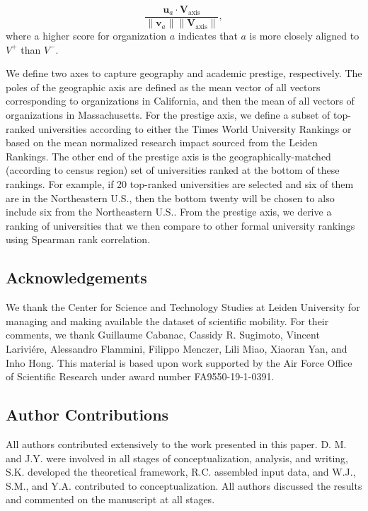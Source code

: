 \documentclass[12pt]{article} %
\begin{document}
\begin{equation}
\frac{\bm{u}_{a} \cdot \bm{V}_{\text{axis}}}{\lVert \bm{v}_{a} \rVert \lVert \bm{V}_{\text{axis}} \rVert},
\end{equation}
where a higher score for organization $a$ indicates that $a$ is more closely aligned to $V^+$ than $V^-$.

We define two axes to capture geography and academic prestige, respectively.
The poles of the geographic axis are defined as the mean vector of all vectors corresponding to organizations in California, and then the mean of all vectors of organizations in Massachusetts.
For the prestige axis, we define a subset of top-ranked universities according to either the Times World University Rankings or based on the mean normalized research impact sourced from the Leiden Rankings.
The other end of the prestige axis is the geographically-matched (according to census region) set of universities ranked at the bottom of these rankings.
For example, if 20 top-ranked universities are selected and six of them are in the Northeastern U.S., then the bottom twenty will be chosen to also include six from the Northeastern U.S..
From the prestige axis, we derive a ranking of universities that we then compare to other formal university rankings using Spearman rank correlation.


%
%
\subsection*{Acknowledgements}
We thank the Center for Science and Technology Studies at Leiden University for managing and making available the dataset of scientific mobility. 
For their comments, we thank Guillaume Cabanac, Cassidy R. Sugimoto, Vincent Lariviére, Alessandro Flammini, Filippo Menczer, Lili Miao, Xiaoran Yan, and Inho Hong. 
This material is based upon work supported by the Air Force Office of Scientific Research under award number FA9550-19-1-0391.


%
% 
\subsection*{Author Contributions}
All authors contributed extensively to the work presented in this paper. D. M. and J.Y. were involved in all stages of conceptualization, analysis, and writing, S.K. developed the theoretical framework, R.C. assembled input data, and W.J., S.M., and Y.A. contributed to conceptualization. 
All authors discussed the results and commented on the manuscript at all stages.
\end{document}
